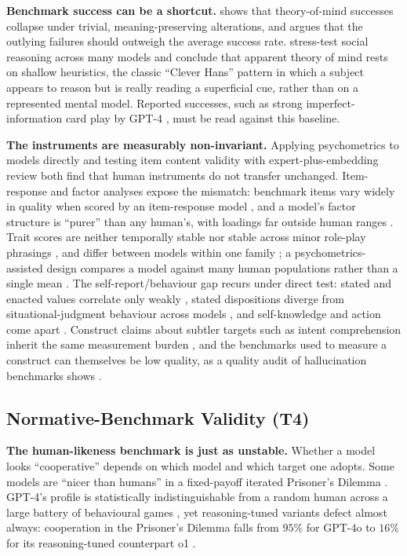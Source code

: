 \documentclass[11pt]{article}
\begin{document}
\textbf{Benchmark success can be a shortcut.} \citet{ullman2023trivial}
shows that theory-of-mind successes collapse under trivial,
meaning-preserving alterations, and argues that the outlying failures
should outweigh the average success rate. \citet{shapira2024clever}
stress-test social reasoning across many models and conclude that apparent
theory of mind rests on shallow heuristics, the classic ``Clever Hans''
pattern in which a subject appears to reason but is really reading a
superficial cue, rather than on a represented mental model. Reported
successes, such as strong imperfect-information card play by GPT-4
\cite{guo2023suspicion}, must be read against this baseline.

\textbf{The instruments are measurably non-invariant.} Applying psychometrics
to models directly \cite{li2024psychometrics} and testing item content validity
with expert-plus-embedding review \cite{milano2025content} both find that human
instruments do not transfer unchanged. Item-response and factor analyses expose
the mismatch: benchmark items vary widely in quality when scored by an
item-response model \cite{zhou2025lost,chen2025compact}, and a model's factor
structure is ``purer'' than any human's, with loadings far outside human ranges
\cite{wang2025emulate}. Trait scores are neither temporally stable
\cite{bodroza2024temporal} nor stable across minor role-play phrasings
\cite{ma2026stable}, and differ between models within one family
\cite{bhandari2025evaluating}; a psychometrics-assisted design compares a model
against many human populations rather than a single mean
\cite{fang2024patch}. The self-report/behaviour gap recurs under direct test:
stated and enacted values correlate only weakly \cite{huang2026knowing}, stated
dispositions diverge from situational-judgment behaviour across models
\cite{taubenfeld2026dispositions}, and self-knowledge and action come apart
\cite{ai2024selfknowledge}. Construct claims about subtler targets such as
intent comprehension inherit the same measurement burden
\cite{kunievsky2025intent}, and the benchmarks used to measure a construct can
themselves be low quality, as a quality audit of hallucination benchmarks shows
\cite{yan2024hqm}.

\subsection{Normative-Benchmark Validity (T4)}
\label{app:t4evidence}

\textbf{The human-likeness benchmark is just as unstable.} Whether a model
looks ``cooperative'' depends on which model and which target one adopts.
Some models are ``nicer than humans'' in a fixed-payoff iterated Prisoner's
Dilemma \cite{fontana2025nicer}. GPT-4's profile is statistically
indistinguishable from a random human across a large battery of behavioural
games \cite{mei2024behavioral}, yet reasoning-tuned variants defect almost
always: cooperation in the
Prisoner's Dilemma falls from $95\%$ for GPT-4o to $16\%$ for its
reasoning-tuned counterpart o1 \cite{li2025spontaneous}.
\end{document}
